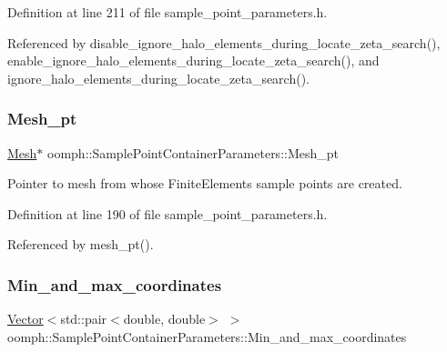 Definition at line 211 of file sample\+\_\+point\+\_\+parameters.\+h.



Referenced by disable\+\_\+ignore\+\_\+halo\+\_\+elements\+\_\+during\+\_\+locate\+\_\+zeta\+\_\+search(), enable\+\_\+ignore\+\_\+halo\+\_\+elements\+\_\+during\+\_\+locate\+\_\+zeta\+\_\+search(), and ignore\+\_\+halo\+\_\+elements\+\_\+during\+\_\+locate\+\_\+zeta\+\_\+search().

\mbox{\label{classoomph_1_1SamplePointContainerParameters_a9047299fdfac8074a9996267d66e901e}} 
\subsubsection{\texorpdfstring{Mesh\+\_\+pt}{Mesh\_pt}}
{\footnotesize\ttfamily \hyperlink{classoomph_1_1Mesh}{Mesh}$\ast$ oomph\+::\+Sample\+Point\+Container\+Parameters\+::\+Mesh\+\_\+pt\hspace{0.3cm}{\ttfamily [protected]}}



Pointer to mesh from whose Finite\+Elements sample points are created. 



Definition at line 190 of file sample\+\_\+point\+\_\+parameters.\+h.



Referenced by mesh\+\_\+pt().

\mbox{\label{classoomph_1_1SamplePointContainerParameters_a980161906be89a1cf50835fe45949cfe}} 
\subsubsection{\texorpdfstring{Min\+\_\+and\+\_\+max\+\_\+coordinates}{Min\_and\_max\_coordinates}}
{\footnotesize\ttfamily \hyperlink{classoomph_1_1Vector}{Vector}$<$std\+::pair$<$double, double$>$ $>$ oomph\+::\+Sample\+Point\+Container\+Parameters\+::\+Min\+\_\+and\+\_\+max\+\_\+coordinates\hspace{0.3cm}{\ttfamily [protected]}}

